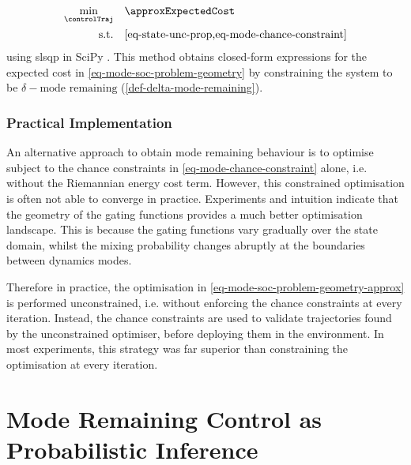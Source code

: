 \documentclass{mimosis-class/mimosis}
\numberwithin{equation}{chapter}
\newcommand{\state}{\ensuremath{\mathbf{x}}}
\newcommand{\control}{\ensuremath{\mathbf{u}}}
\newcommand{\modeVar}{\ensuremath{\alpha}}
\begin{document}
{\begin{subequations} \label{eq-mode-soc-problem-geometry-approx}
\begin{align}
\min_{\controlTraj} & \quad \approxExpectedCost \\
\text{s.t.}& \quad \text{\cref{eq-state-unc-prop,eq-mode-chance-constraint}}
\end{align}
\end{subequations}
using \acrshort{slsqp} in SciPy \citep{2020SciPy-NMeth}.
This method obtains closed-form expressions for the expected cost in \cref{eq-mode-soc-problem-geometry}
by constraining the system to be \(\delta-\text{mode remaining}\) (\cref{def-delta-mode-remaining}).

\subsubsection{Practical Implementation}
\label{sec:orgb82d55e}
An alternative approach to obtain mode remaining behaviour is to optimise subject to the chance constraints
in \cref{eq-mode-chance-constraint} alone, i.e. without the Riemannian energy cost term.
However, this constrained optimisation is often not able to converge in practice.
Experiments and intuition indicate that the geometry of the gating functions provides a much
better optimisation landscape.
This is because the gating functions vary gradually over the state domain, whilst the mixing probability changes
abruptly at the boundaries between dynamics modes.

Therefore in practice, the optimisation in \cref{eq-mode-soc-problem-geometry-approx}
is performed unconstrained, i.e. without enforcing the chance constraints at every iteration.
Instead, the chance constraints are used to validate trajectories found by the unconstrained
optimiser, before deploying them in the environment.
In most experiments, this strategy was far superior than constraining the optimisation at every iteration.

\section{Mode Remaining Control as Probabilistic Inference \label{chap-traj-opt-inference}}
\label{sec:orgac31eb4}
\newcommand{\startStateDist}{\ensuremath{p(\state_{1})}}
\newcommand{\transitionDist}{\ensuremath{p(\state_{\timeInd+1} \mid \state_\timeInd, \control_\timeInd, \modeVar_{\timeInd}=\desiredMode)}}
\renewcommand{\controlDist}{\ensuremath{\policy(\control_\timeInd \mid \state_\timeInd)}}


}
\end{document}
